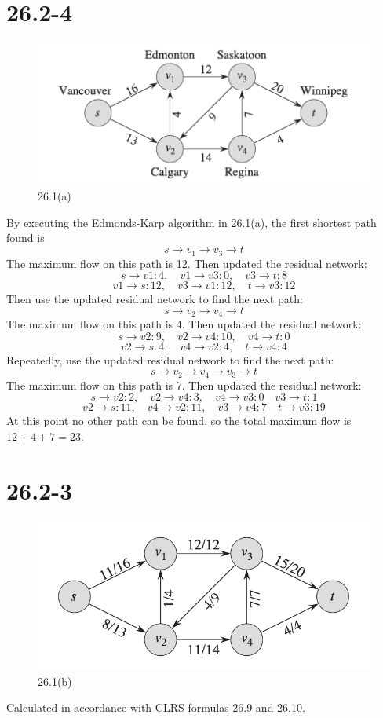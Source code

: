 \documentclass[12pt]{article}
\begin{document}
\section{26.2-4}
\begin{figure}[h]
    \centering
    \includegraphics[width=0.5\linewidth]{截屏2024-11-18 下午8.43.56.png}
    \caption{26.1(a)}
    \label{fig:26.1(a)}
\end{figure}
By executing the Edmonds-Karp algorithm in 26.1(a), the first shortest path found is 
\[s \rightarrow v_1 \rightarrow v_3 \rightarrow t\]
The maximum flow on this path is 12.
Then updated the residual network:
\[s \rightarrow v1: 4, \quad v1 \rightarrow v3: 0, \quad v3 \rightarrow t: 8\]
\[v1 \rightarrow s: 12, \quad v3 \rightarrow v1: 12, \quad t \rightarrow v3: 12\]
Then use the updated residual network to find the next path:
\[s  \rightarrow v_2 \rightarrow v_4 \rightarrow t\]
The maximum flow on this path is 4.
Then updated the residual network:
\[s \rightarrow v2: 9, \quad v2 \rightarrow v4: 10, \quad v4 \rightarrow t: 0 \]
\[v2 \rightarrow s: 4, \quad v4 \rightarrow v2: 4, \quad t \rightarrow v4: 4 \]
Repeatedly, use the updated residual network to find the next path:
\[s \rightarrow v_2 \rightarrow v_4  \rightarrow v_3 \rightarrow t\]
The maximum flow on this path is 7.
Then updated the residual network:
\[s \rightarrow v2: 2, \quad v2 \rightarrow v4: 3, \quad v4 \rightarrow v3: 0 \quad v3 \rightarrow t: 1\]
\[v2 \rightarrow s: 11, \quad v4 \rightarrow v2: 11, \quad v3 \rightarrow v4: 7 \quad t \rightarrow v3: 19\]
At this point no other path can be found, so the total maximum flow is \(12+4+7=23\).
\section{26.2-3}
\begin{figure}[h]
    \centering
    \includegraphics[width=0.5\linewidth]{截屏2024-11-18 下午8.46.37.png}
    \caption{26.1(b)}
    \label{fig:enter-label}

\end{figure}
Calculated in accordance with CLRS formulas 26.9 and 26.10.
\end{document}

